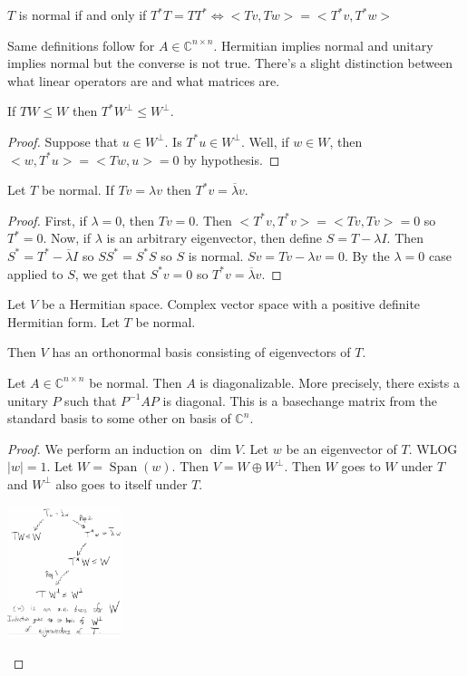 \documentclass{article}
\newcommand{\C}{\mathbb{C}}
\DeclareMathOperator{\Span}{Span}
\begin{document}
\begin{definition}
$T$ is normal if and only if $T^*T=TT^*\iff <Tv,Tw>=<T^*v,T^*w>$
\end{definition}
Same definitions follow for $A\in \C^{n\times n}$. Hermitian implies normal and unitary implies normal but the converse is not true. There's a slight distinction between what linear operators are and what matrices are.
\begin{proposition}
If $TW\leq W$ then $T^*W^\perp\leq W^\perp$.
\end{proposition}
\begin{proof}
Suppose that $u\in W^\perp$. Is $T^*u\in W^\perp$. Well, if $w\in W$, then $<w,T^*u>=<Tw,u>=0$ by hypothesis.
\end{proof}
\begin{proposition}
Let $T$ be normal. If $Tv=\lambda v$ then $T^*v=\overline{\lambda}v$.
\end{proposition}
\begin{proof}
First, if $\lambda=0$, then $Tv=0$. Then $<T^*v,T^*v>=<Tv,Tv>=0$ so $T^*=0$. Now, if $\lambda$ is an arbitrary eigenvector, then define $S=T-\lambda I$. Then $S^*=T^*-\overline{\lambda}I$ so $SS^*=S^*S$ so $S$ is normal. $Sv=Tv-\lambda v=0$. By the $\lambda=0$ case applied to $S$, we get that $S^*v=0$ so $T^*v=\overline{\lambda}v$.
\end{proof}
\begin{theorem}
Let $V$ be a Hermitian space. Complex vector space with a positive definite Hermitian form. Let $T$ be normal.

Then $V$ has an orthonormal basis consisting of eigenvectors of $T$.
\end{theorem}
\begin{theorem}
Let $A\in \C^{n\times n}$ be normal. Then $A$ is diagonalizable. More precisely, there exists a unitary $P$ such that $P^{-1}AP$ is diagonal. This is a basechange matrix from the standard basis to some other on basis of $\C^n$.
\end{theorem}
\begin{proof}
We perform an induction on $\dim V$. Let $w$ be an eigenvector of $T$. WLOG $|w|=1$. Let $W=\Span(w).$ Then $V=W\oplus W^\perp$. Then $W$ goes to $W$ under $T$ and $W^\perp$ also goes to itself under $T$.
\begin{center}
        \includegraphics[width=0.25\textwidth]{Image 1122020.PNG}
    \end{center}
\end{proof}
\end{document}
